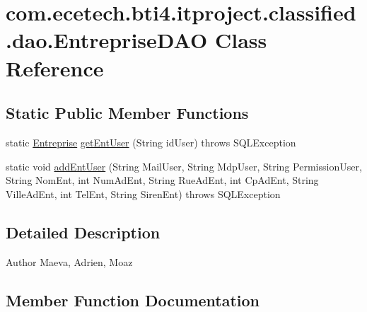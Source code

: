 \hypertarget{classcom_1_1ecetech_1_1bti4_1_1itproject_1_1classified_1_1dao_1_1_entreprise_d_a_o}{}\section{com.\+ecetech.\+bti4.\+itproject.\+classified.\+dao.\+Entreprise\+D\+AO Class Reference}
\label{classcom_1_1ecetech_1_1bti4_1_1itproject_1_1classified_1_1dao_1_1_entreprise_d_a_o}
\subsection*{Static Public Member Functions}
\begin{DoxyCompactItemize}
\item 
static \hyperlink{classcom_1_1ecetech_1_1bti4_1_1itproject_1_1classified_1_1beans_1_1_entreprise}{Entreprise} \hyperlink{classcom_1_1ecetech_1_1bti4_1_1itproject_1_1classified_1_1dao_1_1_entreprise_d_a_o_a158d89d2f3ff3a1e5ca02c9a3751da84}{get\+Ent\+User} (String id\+User)  throws S\+Q\+L\+Exception 
\item 
static void \hyperlink{classcom_1_1ecetech_1_1bti4_1_1itproject_1_1classified_1_1dao_1_1_entreprise_d_a_o_a34495007d915aad23a8ad7a1dab4c179}{add\+Ent\+User} (String Mail\+User, String Mdp\+User, String Permission\+User, String Nom\+Ent, int Num\+Ad\+Ent, String Rue\+Ad\+Ent, int Cp\+Ad\+Ent, String Ville\+Ad\+Ent, int Tel\+Ent, String Siren\+Ent)  throws S\+Q\+L\+Exception 
\end{DoxyCompactItemize}


\subsection{Detailed Description}
\begin{DoxyAuthor}{Author}
Maeva, Adrien, Moaz 
\end{DoxyAuthor}


\subsection{Member Function Documentation}
